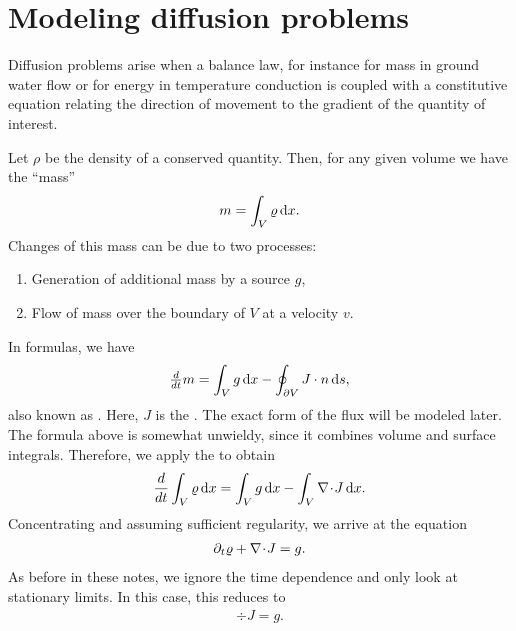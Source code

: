 
\section{Modeling diffusion problems}

\begin{intro}
  Diffusion problems arise when a balance law, for instance for mass
  in ground water flow or for energy in temperature conduction is
  coupled with a constitutive equation relating the direction of
  movement to the gradient of the quantity of interest.
\end{intro}

\begin{intro}
  Let $\rho$ be the density of a conserved quantity. Then, for any given
  volume we have the ``mass''
  \begin{gather*}
    m = \int_V \varrho\,\mathrm{d} x.
  \end{gather*}
  Changes of this mass can be due to two processes:
  \begin{enumerate}
  \item Generation of additional mass by a source $g$,
  \item Flow of mass over the boundary of $V$ at a velocity $v$.
  \end{enumerate}
  In formulas, we have
  \begin{gather*}
    \tfrac{d}{d t} m = \int_V g\,\mathrm{d} x - \oint_{\partial V} J\cdot n \,\mathrm{d} s,
  \end{gather*}
  also known as . Here, $J$ is the
  . The exact form of the flux will be modeled later.
  The formula above is somewhat unwieldy, since it combines volume and
  surface integrals. Therefore, we apply the 
  to obtain
  \begin{gather}
    \label{eq:darcy:2}
    \frac{d}{dt} \int_V \varrho\,\mathrm{d} x = \int_V g\,\mathrm{d} x - \int_V \nabla\!\cdot\! J \,\mathrm{d} x.
  \end{gather}
  Concentrating and assuming sufficient regularity, we arrive at the
  equation
  \begin{gather}
    \label{eq:darcy:3}
    \partial_t \varrho + \nabla\!\cdot\! J = g.
  \end{gather}
  As before in these notes, we ignore the time dependence and only
  look at stationary limits. In this case, this reduces to
  \begin{gather}
    \label{eq:darcy:4}
    \div J = g.
  \end{gather}
\end{intro}

